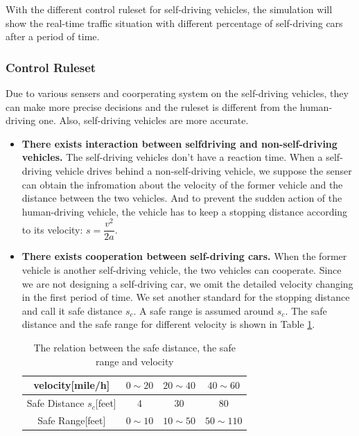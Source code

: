 \documentclass[a4paper]{article}
\begin{document}
	With the different control ruleset for self-driving vehicles, the simulation will show the real-time traffic situation with different percentage of self-driving cars after a period of time.
	
	\subsubsection{Control Ruleset}
	Due to various sensers and coorperating system on the self-driving vehicles, they can make more precise decisions and the ruleset is different from the human-driving one. Also, self-driving vehicles are more accurate.
	\begin{itemize}
		\item \textbf{There exists interaction between selfdriving
			and non-self-driving vehicles.} The self-driving vehicles don't have a reaction time. When a self-driving vehicle drives behind a non-self-driving vehicle, we suppose the senser can obtain the infromation about the velocity of the former vehicle and the distance between the two vehicles. And to prevent the sudden action of the human-driving vehicle, the vehicle has to keep a stopping distance according to its velocity: $ s=\dfrac{v^2}{2a} $. 
		\item \textbf{There exists cooperation between self-driving cars.} When the former vehicle is another self-driving vehicle, the two vehicles can cooperate. Since we are not designing a self-driving car, we omit the detailed velocity changing in the first period of time. We set another standard for the stopping distance and call it safe distance $ s_c $. A safe range is assumed around $ s_c $. The safe distance and the safe range for different velocity is shown in Table \ref{range}. 
		
		\begin{table}[H]
			\centering
			\begin{tabular}{cccc}
				\toprule
				velocity[mile/h] & $ 0\sim20 $  & $ 20\sim40 $ & $ 40\sim60 $ \\
				\midrule
				Safe Distance $ s_c $[feet]  & 4     & 30    & 80 \\
				Safe Range[feet] & $ 0\sim10 $  & $ 10\sim50 $ & $ 50\sim110 $ \\
				\bottomrule
			\end{tabular}%
			\caption{The relation between the safe distance, the safe range and velocity}
			\label{range}%
		\end{table}%
		

\end{itemize}
\end{document}
